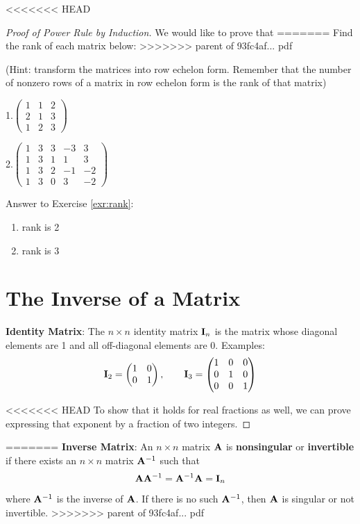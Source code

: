 \documentclass[]{book}
\theoremstyle{definition}
\theoremstyle{definition}
\theoremstyle{definition}
\theoremstyle{remark}
\begin{document}
<<<<<<< HEAD
\begin{proof}[Proof of Power Rule by Induction]
{}
We would like to prove that
=======
Find the rank of each matrix below:
>>>>>>> parent of 93fc4af... pdf

(Hint: transform the matrices into row echelon form. Remember that the number of nonzero rows of a matrix in row echelon form is the rank of that matrix)

1.\(\begin{pmatrix} 1 & 1 & 2 \\ 2 & 1 & 3 \\ 1 & 2 & 3 \end{pmatrix}\)

\bigskip

2.\(\begin{pmatrix} 1 & 3 & 3 & -3 & 3\\ 1 & 3 & 1 & 1 & 3 \\ 1 & 3 & 2 & -1 & -2 \\ 1 & 3 & 0 & 3 & -2 \end{pmatrix}\)

Answer to Exercise \ref{exr:rank}:

\begin{enumerate}
\def\labelenumi{\arabic{enumi}.}
\item
  rank is 2
\item
  rank is 3
\end{enumerate}

\hypertarget{the-inverse-of-a-matrix}{%
\section{The Inverse of a Matrix}\label{the-inverse-of-a-matrix}}

\textbf{Identity Matrix}: The \(n\times n\) identity matrix \({\bf I}_n\) is the matrix whose diagonal elements are 1 and all off-diagonal elements are 0. Examples:
\[ {\bf I}_2=\begin{pmatrix} 1&0\\0&1 \end{pmatrix}, \qquad {\bf I}_3=\begin{pmatrix} 1&0&0\\ 0&1&0\\ 
            0&0&1 \end{pmatrix}\]

<<<<<<< HEAD
To show that it holds for real fractions as well, we can prove expressing that exponent by a fraction of two integers.
\end{proof}
=======
\textbf{Inverse Matrix}: An \(n\times n\) matrix \({\bf A}\) is \textbf{nonsingular} or \textbf{invertible} if there exists an \(n\times n\) matrix \({\bf A}^{-1}\) such that \[{\bf A} {\bf A}^{-1} = {\bf A}^{-1} {\bf A} = {\bf I}_n\] where \({\bf A}^{-1}\) is the inverse of \({\bf A}\). If there is no such \({\bf A}^{-1}\), then \({\bf A}\) is singular or not invertible.
>>>>>>> parent of 93fc4af... pdf
\end{document}
